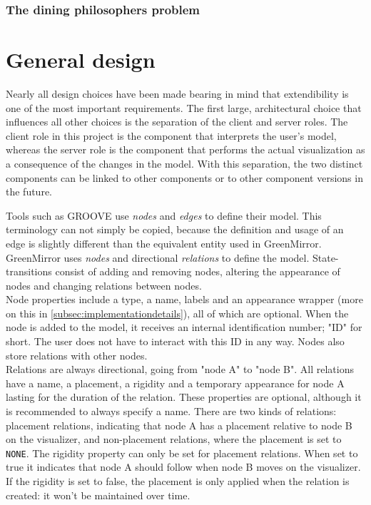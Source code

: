 \documentclass[a4paper]{article}
\begin{document}
	\subsubsection{The dining philosophers problem}
	
	
	
	
	
	
	
	
	
	\section{General design}\label{sec:generaldesign}
	Nearly all design choices have been made bearing in mind that extendibility is one of the most important requirements. The first large, architectural choice that influences all other choices is the separation of the client and server roles. The client role in this project is the component that interprets the user's model, whereas the server role is the component that performs the actual visualization as a consequence of the changes in the model. With this separation, the two distinct components can be linked to other components or to other component versions in the future.
	
	Tools such as GROOVE use \emph{nodes} and \emph{edges} to define their model. This terminology can not simply be copied, because the definition and usage of an edge is slightly different than the equivalent entity used in GreenMirror. GreenMirror uses \emph{nodes} and directional \emph{relations} to define the model. State-transitions consist of adding and removing nodes, altering the appearance of nodes and changing relations between nodes. \\
	Node properties include a type, a name, labels and an appearance wrapper (more on this in \cref{subsec:implementationdetails}), all of which are optional. When the node is added to the model, it receives an internal identification number; "ID" for short. The user does not have to interact with this ID in any way. Nodes also store relations with other nodes. \\
	Relations are always directional, going from "node A" to "node B". All relations have a name, a placement, a rigidity and a temporary appearance for node A lasting for the duration of the relation. These properties are optional, although it is recommended to always specify a name. There are two kinds of relations: placement relations, indicating that node A has a placement relative to node B on the visualizer, and non-placement relations, where the placement is set to \lstinline{NONE}. The rigidity property can only be set for placement relations. When set to true it indicates that node A should follow when node B moves on the visualizer. If the rigidity is set to false, the placement is only applied when the relation is created: it won't be maintained over time.
	
\end{document}

